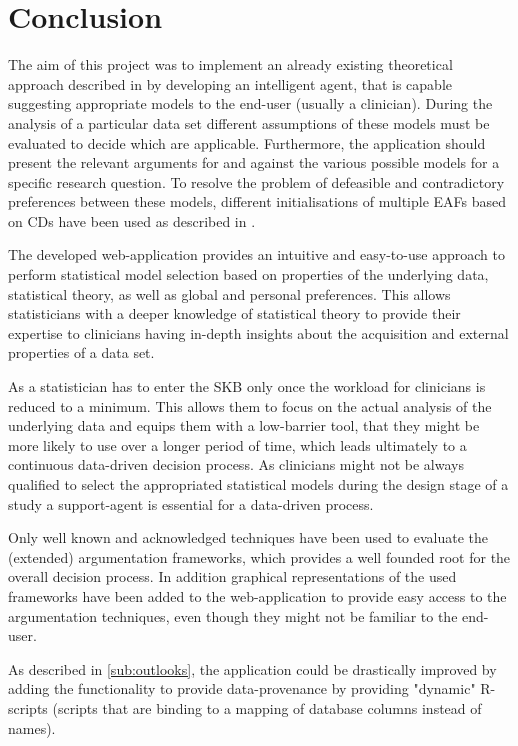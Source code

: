 \section{Conclusion}
\label{sec:conclusion}
The aim of this project was to implement an already existing theoretical approach described in \cite{sassoon2016, sassoon2014, sassoon2016CD} by developing an intelligent agent, that is capable suggesting appropriate models to the end-user (usually a clinician). During the analysis of a particular data set different assumptions of these models must be evaluated to decide which are applicable. Furthermore, the application should present the relevant arguments for and against the various possible models  for a specific research question. To resolve the problem of defeasible and contradictory preferences between these models, different initialisations of multiple \glspl{EAF} based on \glspl{CD} have been used as described in \cite{sassoon2016, sassoon2016CD}.

The developed web-application provides an intuitive and easy-to-use approach to perform statistical model selection based on properties of the underlying data, statistical theory, as well as global and personal preferences. This allows statisticians with a deeper knowledge of statistical theory to provide their expertise to clinicians having in-depth insights about the acquisition and external properties of a data set. 

As a statistician has to enter the \gls{SKB} only once the workload for clinicians is reduced to a minimum. This allows them to focus on the actual analysis of the underlying data and equips them with a low-barrier tool, that they might be more likely to use over a longer period of time, which leads ultimately to a continuous data-driven decision process. As clinicians might not be always qualified to select the appropriated statistical models during the design stage of a study \cite{sassoon2014} a support-agent is essential for a data-driven process.

Only well known and acknowledged techniques have been used to evaluate the (extended) argumentation frameworks, which provides a well founded root for the overall decision process. In addition graphical representations of the used frameworks have been added to the web-application to provide easy access to the argumentation techniques, even though they might not be familiar to the end-user.

As described in \autoref{sub:outlooks}, the application could be drastically improved by adding the functionality to provide data-provenance by providing "dynamic" \gls{R}-scripts (scripts that are binding to a mapping of database columns instead of names). 

